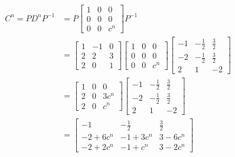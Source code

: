 \documentclass{article}
\begin{document}
$$
\begin{aligned}
    C^{n}
    = PD^{n}P^{-1}
    &= 
    P
    \begin{bmatrix}
        1 & 0 & 0 \\
        0 & 0 & 0 \\
        0 & 0 & c^{n}
    \end{bmatrix}
    P^{-1}
    \\
    &=
    \begin{bmatrix}
        1 & -1 & 0 \\
        2 & 2 & 3 \\
        2 & 0 & 1 
    \end{bmatrix}
    \begin{bmatrix}
        1 & 0 & 0 \\
        0 & 0 & 0 \\
        0 & 0 & c^{n}
    \end{bmatrix}
    \begin{bmatrix}
        -1 & -\frac{1}{2} & \frac{3}{2} \\
        -2 & -\frac{1}{2} & \frac{3}{2} \\
        2 & 1 & -2 
    \end{bmatrix}
    \\
    &=
    \begin{bmatrix}
        1 & 0 & 0 \\
        2 & 0 & 3c^{n} \\
        2 & 0 & c^{n}
    \end{bmatrix}
    \begin{bmatrix}
        -1 & -\frac{1}{2} & \frac{3}{2} \\
        -2 & -\frac{1}{2} & \frac{3}{2} \\
        2 & 1 & -2 
    \end{bmatrix}
    \\
    &=
    \begin{bmatrix}
        -1 & -\frac{1}{2} & \frac{3}{2} \\
        -2 + 6c^n & -1 + 3c^n & 3 - 6c^n \\
        -2 + 2c^n & -1 + c^n & 3 - 2c^n
    \end{bmatrix}
\end{aligned}
$$

\end{document}
